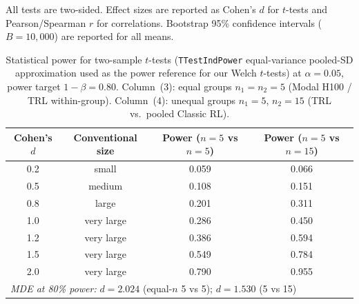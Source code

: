 All tests are two-sided.  Effect sizes are reported as Cohen's $d$ for
$t$-tests and Pearson/Spearman $r$ for correlations.  Bootstrap 95\%
confidence intervals ($B = 10{,}000$) are reported for all means.

\begin{table}[!ht]
\centering
\caption{Statistical power for two-sample $t$-tests (\texttt{TTestIndPower} equal-variance pooled-SD approximation used as the power reference for our Welch $t$-tests) at $\alpha = 0.05$,
         power target $1{-}\beta = 0.80$.
         Column~(3): equal groups $n_1 = n_2 = 5$ (Modal H100 / TRL within-group).
         Column~(4): unequal groups $n_1 = 5$, $n_2 = 15$ (TRL vs.\ pooled Classic RL).}
\label{tab:power-analysis}
\small
\begin{tabular}{@{}cccc@{}}
\toprule
Cohen's $d$ & Conventional size & Power ($n{=}5$ vs $n{=}5$) & Power ($n{=}5$ vs $n{=}15$) \\
\midrule
        0.2 & small & 0.059 & 0.066 \\
        0.5 & medium & 0.108 & 0.151 \\
        0.8 & large & 0.201 & 0.311 \\
        1.0 & very large & 0.286 & 0.450 \\
        1.2 & very large & 0.386 & 0.594 \\
        1.5 & very large & 0.549 & 0.784 \\
        2.0 & very large & 0.790 & 0.955 \\
\midrule
\multicolumn{4}{l}{\textit{MDE at 80\% power:} $d = 2.024$ (equal-$n$ 5 vs 5);\; $d = 1.530$ (5 vs 15)} \\
\bottomrule
\end{tabular}
\end{table}

